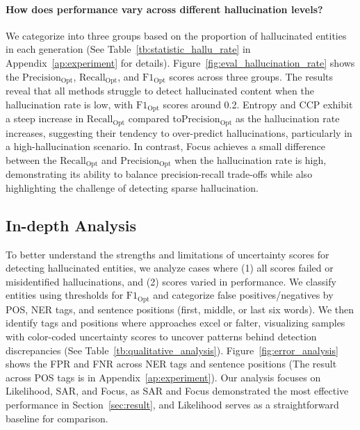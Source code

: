 \paragraph{How does performance vary across different hallucination levels?}

We categorize \dataset into three groups based on the proportion of hallucinated entities in each generation (See Table~\ref{tb:statistic_hallu_rate} in Appendix~\ref{ap:experiment} for details). Figure~\ref{fig:eval_hallucination_rate} shows the $\mathrm{Precision}_\mathrm{Opt}$, $\mathrm{Recall}_\mathrm{Opt}$, and $\mathrm{F1}_\mathrm{Opt}$ scores across three groups. The results reveal that all methods struggle to detect hallucinated content when the hallucination rate is low, with $\mathrm{F1}_\mathrm{Opt}$ scores around 0.2. 
{Entropy and CCP exhibit a steep increase in $\mathrm{Recall}_\mathrm{Opt}$ compared to$\mathrm{Precision}_\mathrm{Opt}$ as the hallucination rate increases, suggesting their tendency to over-predict hallucinations, particularly in a high-hallucination scenario. In contrast, Focus achieves a small difference between the $\mathrm{Recall}_\mathrm{Opt}$ and $\mathrm{Precision}_\mathrm{Opt}$ when the hallucination rate is high, demonstrating its ability to balance precision-recall trade-offs while also highlighting the challenge of detecting sparse hallucination.}



\subsection{In-depth Analysis}\label{sec:qualitative_analysis}

To better understand the strengths and limitations of uncertainty scores for detecting hallucinated entities, we analyze cases where (1) all scores failed or misidentified hallucinations, and (2) scores varied in performance. We classify entities using thresholds for $\mathrm{F1}_\mathrm{Opt}$ and categorize false positives/negatives by POS, NER tags, and sentence positions (first, middle, or last six words). We then identify tags and positions where approaches excel or falter, visualizing samples with color-coded uncertainty scores to uncover patterns behind detection discrepancies (See Table~\ref{tb:qualitative_analysis}). Figure~\ref{fig:error_analysis} shows the FPR and FNR across NER tags and sentence positions (The result across POS tags is in Appendix~\ref{ap:experiment}). Our analysis focuses on Likelihood, SAR, and Focus, as SAR and Focus demonstrated the most effective performance in Section~\ref{sec:result}, and Likelihood serves as a straightforward baseline for comparison.

